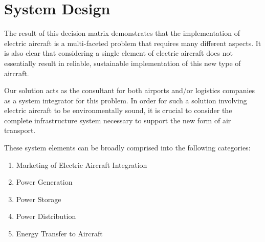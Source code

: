 \documentclass[../main.tex]{subfiles}
\begin{document}
\begin{figure}[ht]
\end{figure}
\FloatBarrier
\section{System Design}\label{sysDesign}
The result of this decision matrix demonstrates that the implementation of electric aircraft is a multi-faceted problem that requires many different aspects. It is also clear that considering a single element of electric aircraft does not essentially result in reliable, sustainable implementation of this new type of aircraft.\par
Our solution acts as the consultant for both airports and/or logistics companies as a system integrator for this problem. In order for such a solution involving electric aircraft to be environmentally sound, it is crucial to consider the complete infrastructure system necessary to support the new form of air transport.\par
These system elements can be broadly comprised into the following categories:
\begin{singlespace}
\begin{enumerate}
    \item Marketing of Electric Aircraft Integration
    \item Power Generation
    \item Power Storage
    \item Power Distribution
    \item Energy Transfer to Aircraft
\end{enumerate}
\end{singlespace}
\newpage
\end{document}
